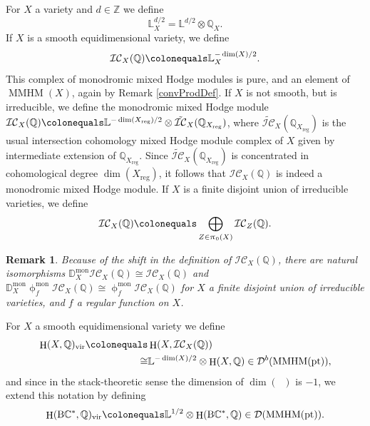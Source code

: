 \documentclass[a4paper,10pt]{amsart}
\renewcommand{\pi}{\uppi\hspace{0.05em}}
\renewcommand{\phi}{\upphi}
\newtheorem{remark}[theorem]{Remark}
\DeclareMathOperator{\BC}{B\mathbb{C}^*}
\newcommand{\DD}{\mathbb{D}}
\newcommand{\LL}{\mathbb{L}}
\newcommand{\ICS}{\mathcal{IC}}
\newcommand{\ICSn}{\tilde{\mathcal{IC}}}
\newcommand{\phim}[1]{\phi^{\mon}_{#1}}
\DeclareMathOperator{\reg}{reg}
\DeclareMathOperator{\mon}{mon}
\DeclareMathOperator{\MMHM}{MMHM}
\DeclareMathOperator{\pt}{pt}
\DeclareMathOperator{\vir}{vir}
\DeclareMathOperator{\HO}{H}
\newcommand{\Db}{\mathcal{D}^{b}}
\newcommand{\Dub}{\mathcal{D}}
\begin{document}
For $X$ a variety and $d\in\mathbb{Z}$ we define 
\[
\LL_X^{d/2}=\LL^{d/2}\otimes \mathbb{Q}_X.
\]
If $X$ is a smooth equidimensional variety, we define 
\[
\ICS_{X}(\mathbb{Q})\colonequals \LL_X^{-\dim(X)/2}.  
\]
This complex of monodromic mixed Hodge modules is pure, and an element of $\MMHM(X)$, again by Remark \ref{convProdDef}.  If $X$ is not smooth, but is irreducible, we define the monodromic mixed Hodge module $\ICS_X(\mathbb{Q})\colonequals \LL^{-\dim(X_{\reg})/2}\otimes \ICSn_X(\mathbb{Q}_{X_{\reg}})$, where $\ICSn_X(\mathbb{Q}_{X_{\reg}})$ is the usual intersection cohomology mixed Hodge module complex of $X$ given by intermediate extension of $\mathbb{Q}_{X_{\reg}}$.   Since $\ICSn_X(\mathbb{Q}_{X_{\reg}})$ is concentrated in cohomological degree $\dim(X_{\reg})$, it follows that $\ICS_X(\mathbb{Q})$ is indeed a monodromic mixed Hodge module.  If $X$ is a finite disjoint union of irreducible varieties, we define 
\[
\ICS_X(\mathbb{Q})\colonequals \bigoplus_{Z\in\pi_0(X)}\ICS_Z(\mathbb{Q}).
\]
\begin{remark}
\label{finSD}
Because of the shift in the definition of $\ICS_X(\mathbb{Q})$, there are natural isomorphisms $\DD^{\mon}_X\ICS_X(\mathbb{Q})\cong\ICS_X(\mathbb{Q})$ and $\DD^{\mon}_X\phim{f}\ICS_X(\mathbb{Q})\cong\phim{f}\ICS_X(\mathbb{Q})$ for $X$ a finite disjoint union of irreducible varieties, and $f$ a regular function on $X$.
\end{remark}


For $X$ a smooth equidimensional variety we define 
\begin{align*}
\HO(X,\mathbb{Q})_{\vir}\colonequals &\HO(X,\ICS_X(\mathbb{Q}))\\\cong&\LL^{-\dim(X)/2}\otimes\HO(X,\mathbb{Q})\in\Db(\MMHM(\pt)),
\end{align*}
and since in the stack-theoretic sense the dimension of  $\dim(\BC)$ is $-1$, we extend this notation by defining 
\[
\HO(\textrm{B}\mathbb{C}^*,\mathbb{Q})_{\vir}\colonequals \LL^{1/2}\otimes \HO(\textrm{B}\mathbb{C}^*,\mathbb{Q})\in \Dub(\MMHM(\pt)).
\]
\end{document}
